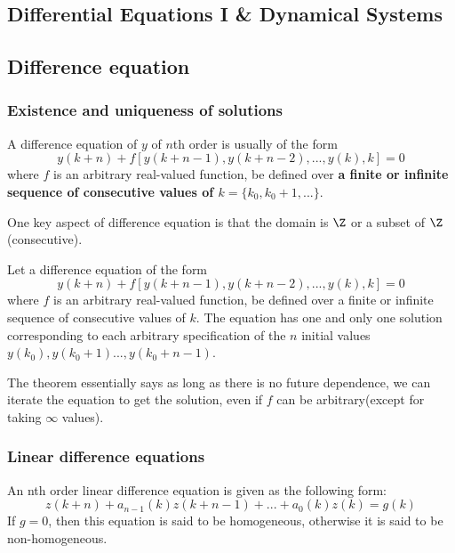 
\begin{refsection}
\startcontents[chapters]
\chapter{Differential Equations I \& Dynamical Systems}\label{ch:dynamical-systems}
	
\section{Difference equation}
\subsection{Existence and uniqueness of solutions}
\begin{definition}
A difference equation of $y$ of $n$th order is usually of the form 
$$y(k+n)+f[y(k+n-1),y(k+n-2),...,y(k),k] = 0$$
where $f$ is an arbitrary real-valued function, be defined over \textbf{a finite or infinite sequence of consecutive values of $k=\{k_0,k_0+1,...\}$}.
\end{definition}

\begin{remark}
One key aspect of difference equation is that the domain is $\Z$ or a subset of $\Z$(consecutive). 
\end{remark}


\begin{theorem}
\cite[19]{luenberger1979introduction}Let a difference equation of the form 
$$y(k+n)+f[y(k+n-1),y(k+n-2),...,y(k),k] = 0$$
where $f$ is an arbitrary real-valued function, be defined over a finite or infinite sequence of consecutive values of $k$. The equation has one and only one solution corresponding to each arbitrary specification of the $n$ initial values $y(k_0),y(k_0+1)...,y(k_0+n-1)$.
\end{theorem}

\begin{remark}
The theorem essentially says as long as there is no future dependence, we can iterate the equation to get the solution, even if $f$ can be arbitrary(except for taking $\infty$ values).
\end{remark}

\subsection{Linear difference equations}
\begin{definition}\cite[26]{luenberger1979introduction}
An nth order linear difference equation is given as the following form:
$$z(k+n)+a_{n-1}(k)z(k+n-1)+...+ a_0(k)z(k)=g(k)$$
If $g = 0$, then this equation is said to be homogeneous, otherwise it is said to be non-homogeneous.
\end{definition}


\end{refsection}
